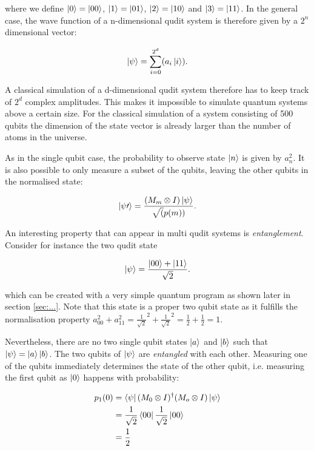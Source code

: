 where we define $\Ket{0} = \Ket{00}$, $\Ket{1} = \Ket{01}$, $\Ket{2} = \Ket{10}$
and $\Ket{3} = \Ket{11}$. In the general case, the wave function of a
n-dimensional qudit system is therefore given by a $2^n$ dimensional vector:

\begin{equation}
  \Ket{\psi} = \sum_{i=0}^{2^d}(a_i \Ket{i}).
\end{equation}

A classical simulation of a d-dimensional qudit system therefore has to keep
track of $2^d$ complex amplitudes. This makes it impossible to simulate quantum
systems above a certain size. For the classical simulation of a system
consisting of 500 qubits the dimension of the state vector is already larger
than the number of atoms in the universe.  

As in the single qubit case, the probability to observe state $\Ket{n}$ is
given by $a_n^2$. It is also possible to only measure a subset of the qubits,
leaving the other qubits in the normalised state:

\begin{equation}
  \Ket{\psi\prime} = \frac{(M_m \otimes I) \Ket{\psi}}{\sqrt(p(m))}.
\end{equation}

An interesting property that can appear in multi qudit systems is
\textit{entanglement}. Consider for instance the two qudit state

\begin{equation}
  \Ket{\psi} = \frac{\Ket{00} + \Ket{11}}{\sqrt{2}}.
\end{equation}

which can be created with a very simple quantum program as shown later in
section \ref{sec:...}.
Note that this state is a proper two qubit state as it fulfills the
normalisation property
$a_{00}^2 + a_{11}^2 = \frac{1}{\sqrt{2}}^2 + \frac{1}{\sqrt{2}}^2 = \frac{1}{2}
+ \frac{1}{2} = 1$.

Nevertheless, there are no two single qubit states $\Ket{a}$
and $\Ket{b}$ such that $\Ket{\psi} = \Ket{a} \Ket{b}$. The two qubits of
$\Ket{\psi}$ are \textit{entangled} with each other. Measuring one of the qubits
immediately determines the state of the other qubit, i.e. measuring the first
qubit as $\Ket{0}$ happens with probability:

\begin{align}
  p_1(0) &= \Bra{\psi} (M_0 \otimes I)^{\dagger} (M_o \otimes I) \Ket{\psi} \\
         &= \frac{1}{\sqrt{2}} \Bra{00} \frac{1}{\sqrt{2}} \Ket{00} \\
         &= \frac{1}{2}
\end{align}

